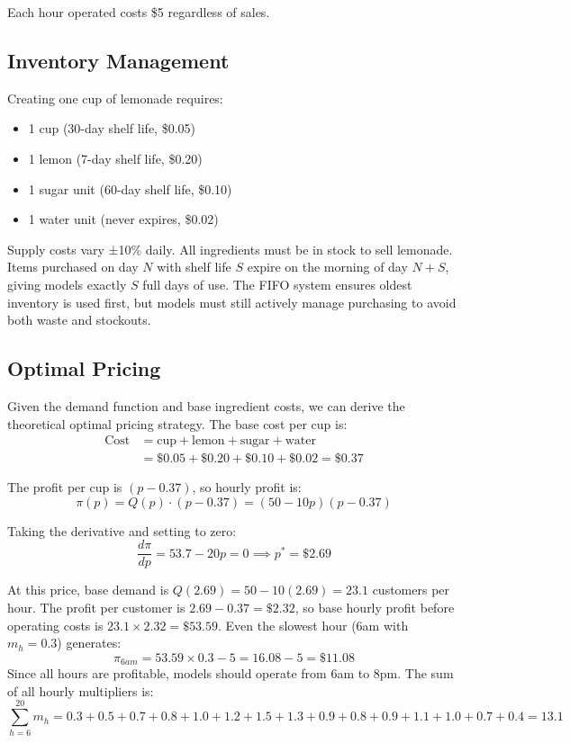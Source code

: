 \documentclass[11pt]{article}
\begin{document}
Each hour operated costs \$5 regardless of sales.

\subsection{Inventory Management}

Creating one cup of lemonade requires:
\begin{itemize}
    \item 1 cup (30-day shelf life, \$0.05)
    \item 1 lemon (7-day shelf life, \$0.20)
    \item 1 sugar unit (60-day shelf life, \$0.10)
    \item 1 water unit (never expires, \$0.02)
\end{itemize}

Supply costs vary ±10\% daily.
All ingredients must be in stock to sell lemonade.
Items purchased on day $N$ with shelf life $S$ expire on the morning of day $N+S$, giving models exactly $S$ full days of use.
The FIFO system ensures oldest inventory is used first, but models must still actively manage purchasing to avoid both waste and stockouts.

\subsection{Optimal Pricing}

Given the demand function and base ingredient costs, we can derive the theoretical optimal pricing strategy. The base cost per cup is:
\begin{align}
\text{Cost} &= \text{cup} + \text{lemon} + \text{sugar} + \text{water}\\
&= \$0.05 + \$0.20 + \$0.10 + \$0.02 = \$0.37
\end{align}

The profit per cup is $(p - 0.37)$, so hourly profit is:
\begin{equation}
\pi(p) = Q(p) \cdot (p - 0.37) = (50 - 10p)(p - 0.37)
\end{equation}

Taking the derivative and setting to zero:
\begin{equation}
\frac{d\pi}{dp} = 53.7 - 20p = 0 \implies p^* = \$2.69
\end{equation}

At this price, base demand is $Q(2.69) = 50 - 10(2.69) = 23.1$ customers per hour. The profit per customer is $2.69 - 0.37 = \$2.32$, so base hourly profit before operating costs is $23.1 \times
2.32 = \$53.59$. Even the slowest hour (6am with $m_h = 0.3$) generates:
\begin{equation}
\pi_{6am} = 53.59 \times 0.3 - 5 = 16.08 - 5 = \$11.08
\end{equation}
Since all hours are profitable, models should operate from 6am to 8pm. The sum of all hourly multipliers is:
\begin{equation}
\sum_{h=6}^{20} m_h = 0.3 + 0.5 + 0.7 + 0.8 + 1.0 + 1.2 + 1.5 + 1.3 + 0.9 + 0.8 + 0.9 + 1.1 + 1.0 + 0.7 + 0.4 = 13.1
\end{equation}
\end{document}
